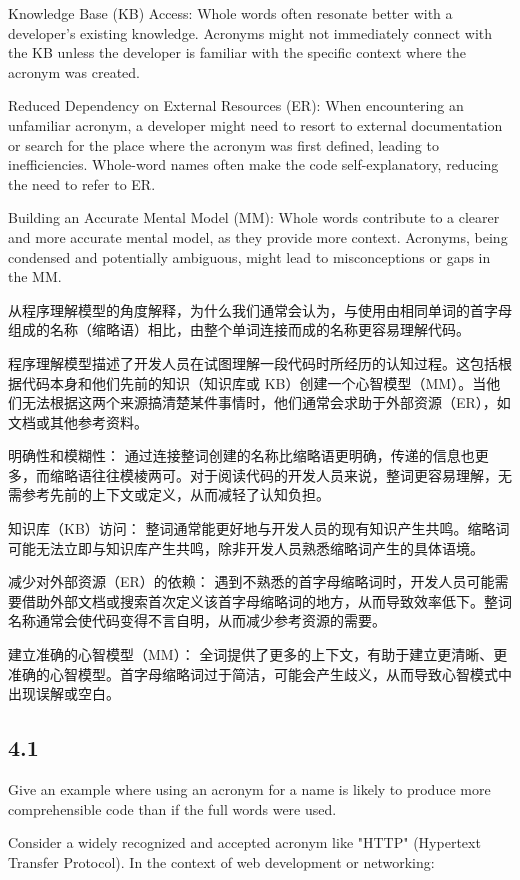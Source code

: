 \documentclass[]{ctexbook}
\begin{document}
Knowledge Base (KB) Access: Whole words often resonate better with a developer's existing knowledge. Acronyms might not immediately connect with the KB unless the developer is familiar with the specific context where the acronym was created.

Reduced Dependency on External Resources (ER): When encountering an unfamiliar acronym, a developer might need to resort to external documentation or search for the place where the acronym was first defined, leading to inefficiencies. Whole-word names often make the code self-explanatory, reducing the need to refer to ER.

Building an Accurate Mental Model (MM): Whole words contribute to a clearer and more accurate mental model, as they provide more context. Acronyms, being condensed and potentially ambiguous, might lead to misconceptions or gaps in the MM.

从程序理解模型的角度解释，为什么我们通常会认为，与使用由相同单词的首字母组成的名称（缩略语）相比，由整个单词连接而成的名称更容易理解代码。

程序理解模型描述了开发人员在试图理解一段代码时所经历的认知过程。这包括根据代码本身和他们先前的知识（知识库或 KB）创建一个心智模型（MM）。当他们无法根据这两个来源搞清楚某件事情时，他们通常会求助于外部资源（ER），如文档或其他参考资料。

明确性和模糊性： 通过连接整词创建的名称比缩略语更明确，传递的信息也更多，而缩略语往往模棱两可。对于阅读代码的开发人员来说，整词更容易理解，无需参考先前的上下文或定义，从而减轻了认知负担。

知识库（KB）访问： 整词通常能更好地与开发人员的现有知识产生共鸣。缩略词可能无法立即与知识库产生共鸣，除非开发人员熟悉缩略词产生的具体语境。

减少对外部资源（ER）的依赖： 遇到不熟悉的首字母缩略词时，开发人员可能需要借助外部文档或搜索首次定义该首字母缩略词的地方，从而导致效率低下。整词名称通常会使代码变得不言自明，从而减少参考资源的需要。

建立准确的心智模型（MM）： 全词提供了更多的上下文，有助于建立更清晰、更准确的心智模型。首字母缩略词过于简洁，可能会产生歧义，从而导致心智模式中出现误解或空白。

\subsection{4.1}
Give an example where using an acronym for a name is likely to produce more comprehensible code than if the full words were used.

Consider a widely recognized and accepted acronym like "HTTP" (Hypertext Transfer Protocol). In the context of web development or networking:
\end{document}
